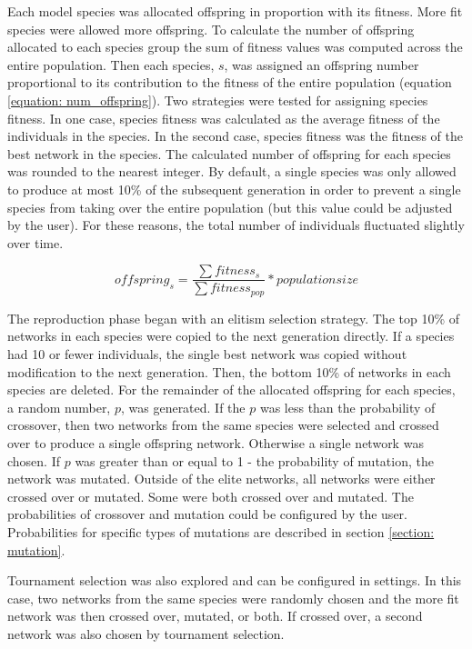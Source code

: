 \documentclass[12pt]{report}
\begin{document}
Each model species was allocated offspring in proportion with its fitness. More fit species were allowed more offspring. To calculate the number of offspring allocated to each species group the sum of fitness values was computed across the entire population. Then each species, $s$, was assigned an offspring number proportional to its contribution to the fitness of the entire population (equation \ref{equation: num_offspring}). Two strategies were tested for assigning species fitness. In one case, species fitness was calculated as the average fitness of the individuals in the species. In the second case, species fitness was the fitness of the best network in the species. The calculated number of offspring for each species was rounded to the nearest integer. By default, a single species was only allowed to produce at most 10\% of the subsequent generation in order to prevent a single species from taking over the entire population (but this value could be adjusted by the user). For these reasons, the total number of individuals fluctuated slightly over time.


\begin{equation}
\label{equation: num_offspring}
offspring_{s} = \frac{\sum{fitness_{s}}}{\sum{fitness_{pop}}}*populationsize
\end{equation} 


The reproduction phase began with an elitism selection strategy. The top 10\% of networks in each species were copied to the next generation directly. If a species had 10 or fewer individuals, the single best network was copied without modification to the next generation. Then, the bottom 10\% of networks in each species are deleted. For the remainder of the allocated offspring for each species, a random number, $p$, was generated. If the $p$ was less than the probability of crossover, then two networks from the same species were selected and crossed over to produce a single offspring network. Otherwise a single network was chosen. If $p$ was greater than or equal to 1 - the probability of mutation, the network was mutated. Outside of the elite networks, all networks were either crossed over or mutated. Some were both crossed over and mutated. The probabilities of crossover and mutation could be configured by the user. Probabilities for specific types of mutations are described in section \ref{section: mutation}.

Tournament selection was also explored and can be configured in settings. In this case, two networks from the same species were randomly chosen and the more fit network was then crossed over, mutated, or both. If crossed over, a second network was also chosen by tournament selection.
\end{document}
